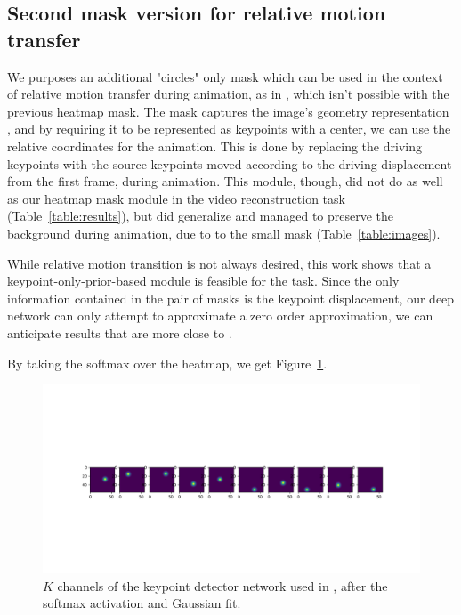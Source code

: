 \documentclass{article}
\begin{document}
\subsection{Second mask version for relative motion transfer}
\label{circles-mask}
We purposes an additional "circles" only mask
which can be used in the context
of relative motion transfer during animation, as in
\cite{siarohin2020order}, which isn't possible with the previous heatmap mask.
The mask captures the image's geometry representation \cite{wu2019transgaga},
and by requiring it to be represented as keypoints with a center, we can use
the relative coordinates for the animation. This is done by replacing the
driving keypoints with the source keypoints moved according to the driving
displacement from the first frame, during animation. This module, though,
did not do as well as our heatmap mask module in the video reconstruction
task (Table~\ref{table:results}), but did generalize and managed to
preserve the background during animation, due to to the
small mask (Table~\ref{table:images}).

While relative motion transition is not always desired, this work shows that
a keypoint-only-prior-based module is feasible for the task.
Since the only information contained in the pair of masks is the keypoint
displacement, our deep network can only attempt to approximate a zero order
approximation, we can anticipate results that are more close to
\cite{siarohin2019animating}.

By taking the softmax over the heatmap, we get Figure~\ref{softmax-10kp}.
\begin{figure}[ht]
\vskip 0.2in
\begin{center}
\centerline{\includegraphics[width=\columnwidth]{visualizations/softmax_10kp}}
\caption{
$K$ channels of the keypoint detector network used in
\cite{siarohin2020order}, after the softmax activation and Gaussian fit.
}
\label{softmax-10kp}
\end{center}
\vskip -0.2in
\end{figure}
\end{document}
